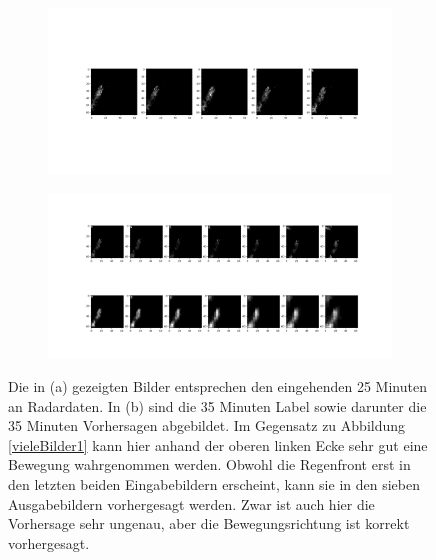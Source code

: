 \begin{figure}[h]
	\centering
	\begin{subfigure}[]{\linewidth} 
		\centering
		\includegraphics[width=\linewidth]{pics/dt5.png}
		\caption[]{}\label{ga}
	\end{subfigure}
	
	\begin{subfigure}[]{\linewidth} 
		\centering
		\includegraphics[width=\linewidth]{pics/t5.png}
		\caption[]{}\label{gb}
	\end{subfigure}
	
	\caption[Validierungsdaten und Label sowie Vorhersage 2]{Die in (a) gezeigten Bilder entsprechen den eingehenden 25 Minuten an Radardaten. In (b) sind die 35 Minuten Label sowie darunter die 35 Minuten Vorhersagen abgebildet. Im Gegensatz zu Abbildung \ref{vieleBilder1} kann hier anhand der oberen linken Ecke sehr gut eine Bewegung wahrgenommen werden. Obwohl die Regenfront erst in den letzten beiden Eingabebildern erscheint, kann sie in den sieben Ausgabebildern vorhergesagt werden. Zwar ist auch hier die Vorhersage sehr ungenau, aber die Bewegungsrichtung ist korrekt vorhergesagt.}
	\label{vieleBilder2}
\end{figure}



